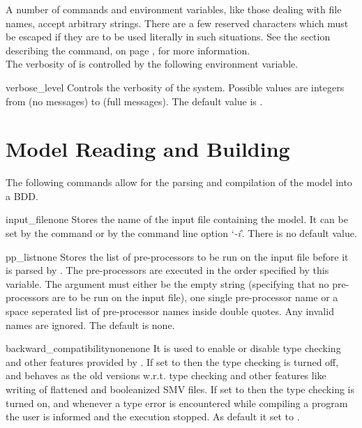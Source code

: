 A number of commands and environment variables, like those dealing
with file names, accept arbitrary strings. There are a few reserved
characters which must be escaped if they are to be used literally in
such situations. See the section describing the 
command, on page \pageref{History Command}, for more information.\\

The verbosity of \nusmv is controlled by the following environment
variable.

\begin{nusmvVar} {verbose\_level}{}{}
Controls the verbosity of the system. Possible values are integers from
 (no messages) to  (full messages). The
default value is .
\end{nusmvVar}

\section{Model Reading and Building}
The following commands allow for the parsing and compilation of the
model into a BDD.



\begin{nusmvVar} {input\_file}{}{none}
Stores the name of the input file containing the
model. It can be set by the  command or by the command
line option `{\it -i}'. There is no default value.
\end{nusmvVar}

\begin{nusmvVar} {pp\_list}{}{none}
Stores the list of pre-processors to be run on the input file before
it is parsed by \nusmv. The pre-processors are executed in the order
specified by this variable. The argument must either be the empty
string (specifying that no pre-processors are to be run on the input
file), one single pre-processor name or a space seperated list of
pre-processor names inside double quotes. Any invalid names are
ignored. The default is none.
\end{nusmvVar}



\label{ref::backwardcompatibility}
\begin{nusmvVar} {backward\_compatibility}{none}{none}
  It is used to enable or disable type checking and other features
  provided by \NuSMV. If set to  then the type checking is
  turned off, and \nusmv behaves as the old versions w.r.t. type
  checking and other features like writing of flattened and
  booleanized SMV files. If set to  then the type checking is
  turned on, and whenever a type error is encountered while compiling
  a \nusmv program the user is informed and the execution stopped.
  As default it set to .
\end{nusmvVar}


